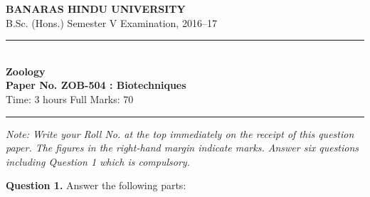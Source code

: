 \documentclass[11pt,a4paper]{article}
\begin{document}
\begin{center}
  {\large\bfseries BANARAS HINDU UNIVERSITY}\\[2pt]
  {\normalsize B.Sc. (Hons.) Semester V Examination, 2016--17}\\[6pt]
  \rule{0.8\linewidth}{0.5pt}\\[6pt]
  {\large\bfseries Zoology}\\[4pt]
  {\large\bfseries Paper No. ZOB-504 : Biotechniques}\\[4pt]
  {\normalsize Time: 3 hours \hfill Full Marks: 70}
\end{center}

\rule{\linewidth}{0.4pt}

\smallskip



\noindent   \textit{Note: Write your Roll No. at the top immediately on the receipt of this question paper. The figures in the right-hand margin indicate marks. Answer six questions including Question 1 which is compulsory.}

\bigskip



\noindent   \textbf{Question 1.} Answer the following parts:
\end{document}
